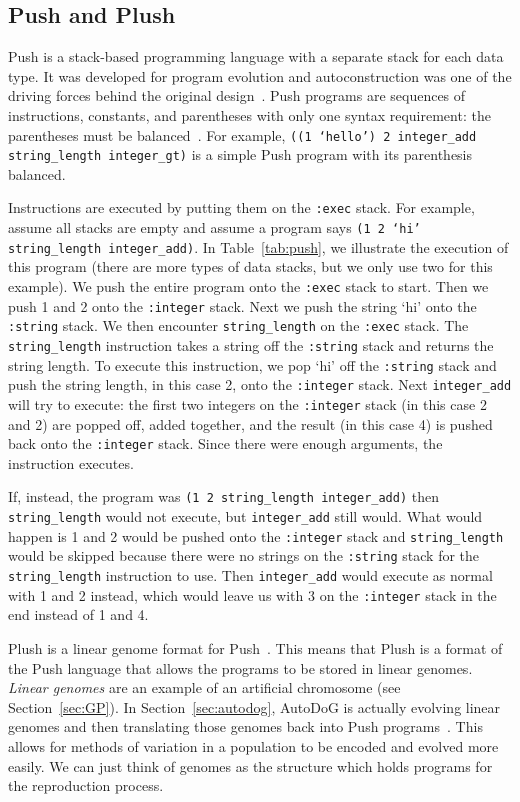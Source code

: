 \documentclass{sig-alternate}
\begin{document}
\subsection{Push and Plush}
\label{sec:push}
Push is a stack-based programming language with a separate stack for each data type. It was developed for program evolution and autoconstruction was one of the driving forces behind the original design~\cite{spector:2016}. Push programs are sequences of instructions, constants, and parentheses with only one syntax requirement: the parentheses must be balanced~\cite{lee:2001}. For example, \texttt{((1 `hello') 2 integer\_add string\_length integer\_gt)} is a simple Push program with its parenthesis balanced.

Instructions are executed by putting them on the \texttt{:exec} stack. For example, assume all stacks are empty and assume a program says \texttt{(1 2 `hi' string\_length integer\_add)}. In Table~\ref{tab:push}, we illustrate the execution of this program (there are more types of data stacks, but we only use two for this example). We push the entire program onto the \texttt{:exec} stack to start. Then we push 1 and 2 onto the \texttt{:integer} stack. Next we push the string `hi' onto the \texttt{:string} stack. We then encounter \texttt{string\_length} on the \texttt{:exec} stack. The \texttt{string\_length} instruction takes a string off the \texttt{:string} stack and returns the string length. To execute this instruction, we pop `hi' off the \texttt{:string} stack and push the string length, in this case 2, onto the \texttt{:integer} stack. Next \texttt{integer\_add} will try to execute: the first two integers on the \texttt{:integer} stack (in this case 2 and 2) are popped off, added together, and the result (in this case 4) is pushed back onto the \texttt{:integer} stack. Since there were enough arguments, the instruction executes.~\cite{lee:tutorial}

If, instead, the program was \texttt{(1 2 string\_length integer\_add)} then \texttt{string\_length} would not execute, but \texttt{integer\_add} still would. What would happen is 1 and 2 would be pushed onto the \texttt{:integer} stack and \texttt{string\_length} would be skipped because there were no strings on the \texttt{:string} stack for the \texttt{string\_length} instruction to use. Then \texttt{integer\_add} would execute as normal with 1 and 2 instead, which would leave us with 3 on the \texttt{:integer} stack in the end instead of 1 and 4.

Plush is a linear genome format for Push~\cite{spector:2016}. This means that Plush is a format of the Push language that allows the programs to be stored in linear genomes. \textit{Linear genomes} are an example of an artificial chromosome (see Section~\ref{sec:GP}). In Section~\ref{sec:autodog}, AutoDoG is actually evolving linear genomes and then translating those genomes back into Push programs~\cite{spector:2016}. This allows for methods of variation in a population to be encoded and evolved more easily. We can just think of genomes as the structure which holds programs for the reproduction process.
\end{document}
